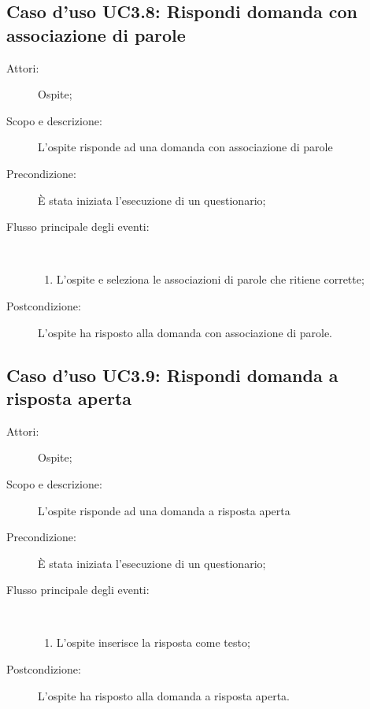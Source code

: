 \subsection{Caso d'uso UC3.8: Rispondi domanda con associazione di parole}\begin{description}
	\item[Attori:] Ospite;
	\item[Scopo e descrizione:] L'ospite risponde ad una domanda con associazione di parole
	\item[Precondizione:] È stata iniziata l'esecuzione di un questionario;
	
	\item[Flusso principale degli eventi:] \ 
	\begin{enumerate}
		\item L'ospite e seleziona le associazioni di parole che ritiene corrette;
		
	\end{enumerate}
	\item[Postcondizione:] L'ospite ha risposto alla domanda con associazione di parole.
\end{description}
\hypertarget{UC3.9}{}
\subsection{Caso d'uso UC3.9: Rispondi domanda a risposta aperta}\begin{description}
	\item[Attori:] Ospite;
	\item[Scopo e descrizione:] L'ospite risponde ad una domanda a risposta aperta
	\item[Precondizione:] È stata iniziata l'esecuzione di un questionario;
	
	\item[Flusso principale degli eventi:] \ 
	\begin{enumerate}
		\item L'ospite inserisce la risposta come testo;
		
	\end{enumerate}
	\item[Postcondizione:] L'ospite ha risposto alla domanda a risposta aperta.
\end{description}
\hypertarget{UC3.10}{}
